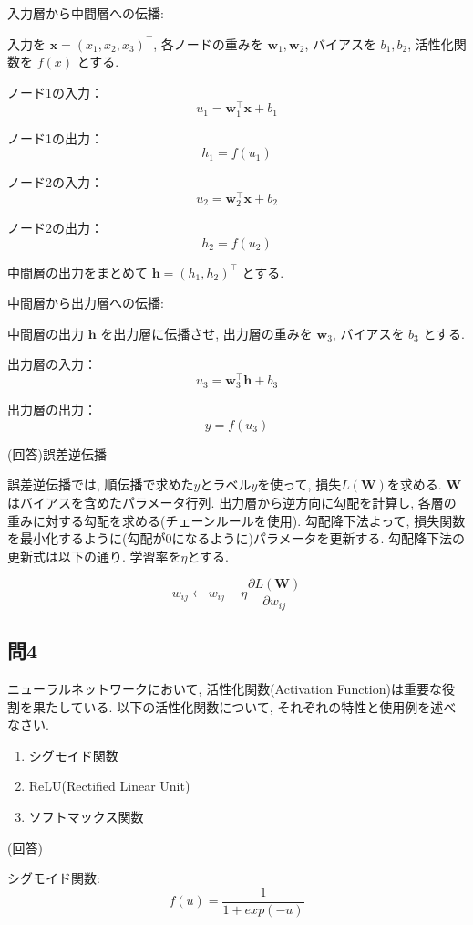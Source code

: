 \documentclass[dvipdfmx, 10pt]{jsarticle}
\begin{document}
\begin{framed}
入力層から中間層への伝播: 

入力を $\mathbf{x} = (x_1, x_2, x_3)^{\top}$, 各ノードの重みを $\mathbf{w}_1, \mathbf{w}_2$, バイアスを $b_1, b_2$, 活性化関数を $f(x)$ とする. 

ノード1の入力：
\[
u_1 = \mathbf{w}_1^{\top} \mathbf{x} + b_1
\]

ノード1の出力：
\[
h_1 = f(u_1)
\]

ノード2の入力：
\[
u_2 = \mathbf{w}_2^{\top} \mathbf{x} + b_2
\]

ノード2の出力：
\[
h_2 = f(u_2)
\]

中間層の出力をまとめて $\mathbf{h} = (h_1, h_2)^{\top}$ とする. 

中間層から出力層への伝播:

中間層の出力 $\mathbf{h}$ を出力層に伝播させ, 出力層の重みを $\mathbf{w}_3$, バイアスを $b_3$ とする. 

出力層の入力：
\[
u_3 = \mathbf{w}_3^{\top} \mathbf{h} + b_3
\]

出力層の出力：
\[
y = f(u_3)
\]
\end{framed}

(回答)誤差逆伝播

誤差逆伝播では, 順伝播で求めた$\hat{y}$とラベル$y$を使って, 損失$L(\mathbf{W})$を求める. $\mathbf{W}$はバイアスを含めたパラメータ行列. 
出力層から逆方向に勾配を計算し, 各層の重みに対する勾配を求める(チェーンルールを使用). 
勾配降下法よって, 損失関数を最小化するように(勾配が$0$になるように)パラメータを更新する. 
勾配降下法の更新式は以下の通り. 学習率を$\eta$とする. 

\[
w_{ij} \leftarrow w_{ij} - \eta \frac{\partial L(\mathbf{W})}{\partial w_{ij}}
\]

\subsection*{問4}
ニューラルネットワークにおいて, 活性化関数(Activation Function)は重要な役割を果たしている. 以下の活性化関数について, それぞれの特性と使用例を述べなさい.   
\begin{enumerate}
    \item シグモイド関数
    \item ReLU(Rectified Linear Unit)
    \item ソフトマックス関数
\end{enumerate}

(回答)

シグモイド関数: 
\[
f(u) = \frac{1}{1 + exp(-u)}
\]
\end{document}
